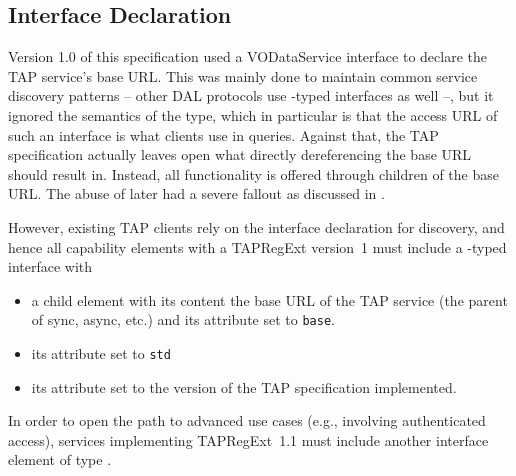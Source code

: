 \documentclass{ivoa}
\begin{document}
\subsection{Interface Declaration}
\label{intfdecl}

Version 1.0 of this specification used a VODataService
 interface to declare the TAP service's base URL.
This was mainly done to maintain common service discovery patterns --
other DAL protocols use -typed interfaces as well
--, but it ignored the semantics of the type, which in particular is
that the access URL of such an interface is what clients use in queries.
Against that, the TAP specification actually leaves open what
directly dereferencing the base URL should result in.  Instead, all
functionality is offered through children of the base URL.  The abuse of
 later had a severe fallout as discussed in
\citet{note:caproles}.

However, existing TAP clients rely on the interface declaration for
discovery, and hence all
capability elements with a TAPRegExt version~1  must include
a -typed interface with

\begin{itemize}
\item a child element  with its content the base URL of
the TAP service (the parent of sync, async, etc.) and its 
attribute set to \verb|base|.
\item its  attribute set to \verb|std|
\item its  attribute set to the version of the TAP
specification implemented.
\end{itemize}

In order to open the path to advanced use cases (e.g., involving
authenticated access), services implementing TAPRegExt~1.1 must include
another interface element of type .
\end{document}
